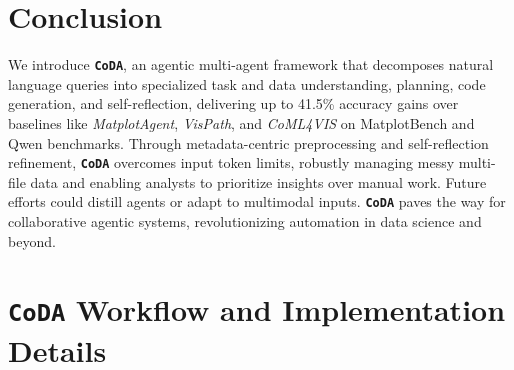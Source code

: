 \documentclass[11pt, a4paper, logo, copyright]{googlecloud}
\newcommand{\methodname}{\textbf{\texttt{\textcolor{StarIndigo}{C}\textcolor{StarIndigo}{o}\textcolor{StarCoral}{D}\textcolor{StarTeal}{A}}}}
\begin{document}
\section{Conclusion}

We introduce \methodname{}, an agentic multi-agent framework that decomposes natural language queries into specialized task and data understanding, planning, code generation, and self-reflection, delivering up to 41.5\% accuracy gains over baselines like \textit{MatplotAgent}, \textit{VisPath}, and \textit{CoML4VIS} on MatplotBench and Qwen benchmarks. 
Through metadata-centric preprocessing and self-reflection refinement, \methodname{} overcomes input token limits, robustly managing messy multi-file data and enabling analysts to prioritize insights over manual work.
Future efforts could distill agents or adapt to multimodal inputs. \methodname{} paves the way for collaborative agentic systems, revolutionizing automation in data science and beyond.





\nobibliography*


\clearpage

\appendix




\section{\methodname{} Workflow and Implementation Details}
\end{document}
